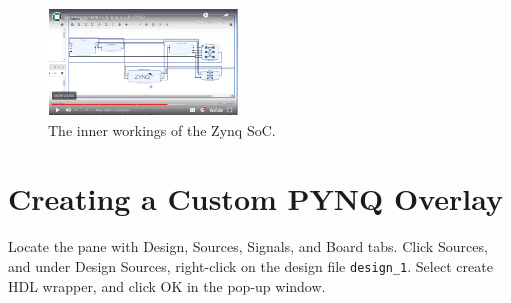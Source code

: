 \documentclass{article}
\begin{document}
\begin{figure}
\centering
\includegraphics[width=0.45\textwidth]{fir_video_6.png}
\caption{\label{fig:vid_5} The inner workings of the Zynq SoC.}
\end{figure}

\section{Creating a Custom PYNQ Overlay}

Locate the pane with Design, Sources, Signals, and Board tabs.  Click Sources, and under Design Sources, right-click on the design file \verb+design_1+.  Select create HDL wrapper, and click OK in the pop-up window.
\end{document}
